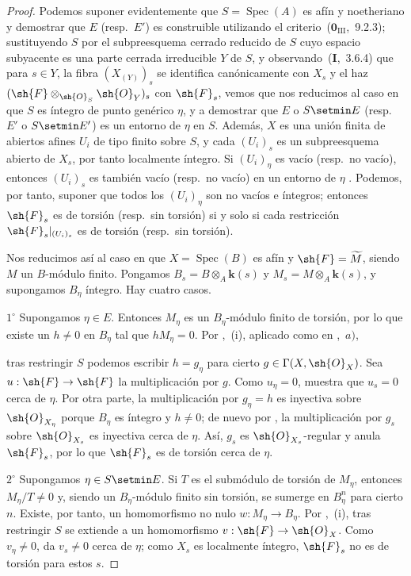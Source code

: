 \begin{proof}
Podemos suponer evidentemente que $S=\operatorname{Spec}(A)$ es afín y noetheriano y demostrar que $E$ (resp.\ $E'$) es construible utilizando el criterio~($\mathbf{0}_{\mathrm{III}}$,~9.2.3); sustituyendo $S$ por el subpreesquema cerrado reducido de $S$ cuyo espacio subyacente es una parte cerrada irreducible $Y$ de $S$, y observando~(\textbf{I},~3.6.4) que para $s\in Y$, la fibra $(X_{(Y)})_s$ se identifica canónicamente con $X_s$ y el haz $(\sh{F}\otimes_{\sh{O}_S}\sh{O}_Y)_s$ con $\sh{F}_s$, vemos que nos reducimos al caso en que $S$ es íntegro de punto genérico $\eta$, y a demostrar que $E$ o $S\setmin E$ (resp.\ $E'$ o $S\setmin E'$) es un entorno de $\eta$ en $S$.
Además, $X$ es una unión finita de abiertos afines $U_i$ de tipo finito sobre $S$, y cada $(U_i)_s$ es un subpreesquema abierto de $X_s$, por tanto localmente íntegro. Si $(U_i)_\eta$ es vacío (resp.\ no vacío), entonces $(U_i)_s$ es también vacío (resp.\ no vacío) en un entorno de $\eta$ . Podemos, por tanto, suponer que todos los $(U_i)_\eta$ son no vacíos e íntegros; entonces $\sh{F}_s$ es de torsión (resp.\ sin torsión) si y solo si cada restricción $\sh{F}_s|_{(U_i)_s}$ es de torsión (resp.\ sin torsión).

Nos reducimos así al caso en que $X=\operatorname{Spec}(B)$ es afín y $\sh{F}=\widetilde{M}$, siendo $M$ un $B$-módulo finito. Pongamos $B_s=B\otimes_A\boldsymbol{k}(s)$ y $M_s=M\otimes_A\boldsymbol{k}(s)$, y supongamos $B_\eta$ íntegro. Hay cuatro casos.

$1^\circ$ Supongamos $\eta\in E$. Entonces $M_\eta$ es un $B_\eta$-módulo finito de torsión, por lo que existe un $h\neq 0$ en $B_\eta$ tal que $hM_\eta=0$. Por ,~(i), aplicado como en ,~$a)$,


tras restringir $S$ podemos escribir $h=g_\eta$ para cierto $g\in\Gamma(X,\sh{O}_X)$. Sea $u:\sh{F}\to\sh{F}$ la multiplicación por $g$. Como $u_\eta=0$,  muestra que $u_s=0$ cerca de $\eta$. Por otra parte, la multiplicación por $g_\eta=h$ es inyectiva sobre $\sh{O}_{X_\eta}$ porque $B_\eta$ es íntegro y $h\neq 0$; de nuevo por , la multiplicación por $g_s$ sobre $\sh{O}_{X_s}$ es inyectiva cerca de $\eta$. Así, $g_s$ es $\sh{O}_{X_s}$-regular y anula $\sh{F}_s$, por lo que $\sh{F}_s$ es de torsión cerca de $\eta$.

$2^\circ$ Supongamos $\eta\in S\setmin E$. Si $T$ es el submódulo de torsión de $M_\eta$, entonces $M_\eta/T\neq 0$ y, siendo un $B_\eta$-módulo finito sin torsión, se sumerge en $B_\eta^n$ para cierto $n$. Existe, por tanto, un homomorfismo no nulo $w:M_\eta\to B_\eta$. Por ,~(i), tras restringir $S$ se extiende a un homomorfismo $v:\sh{F}\to\sh{O}_X$. Como $v_\eta\neq 0$,  da $v_s\neq 0$ cerca de $\eta$; como $X_s$ es localmente íntegro, $\sh{F}_s$ no es de torsión para estos $s$.


\end{proof}
